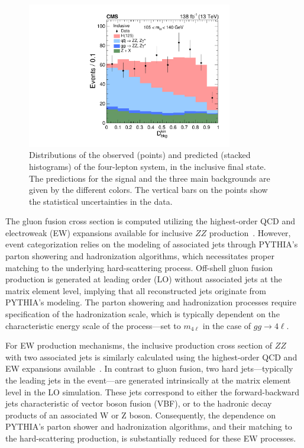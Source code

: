\begin{figure}[!htb]
\centering
\includegraphics[width=0.8\textwidth,clip] {figures/Figure_004.pdf}
\caption{Distributions of the observed (points) and predicted (stacked histograms) \Dbkgkin of the four-lepton system, in the inclusive final state. The predictions for the \Hboson signal and the three main backgrounds are given by the different colors.  The vertical bars on the points show the statistical uncertainties in the data.}
\label{fig:DiscDist}
\end{figure}


The gluon fusion cross section is computed utilizing the highest-order QCD and electroweak (EW) expansions available for inclusive $ZZ$ production~\cite{deFlorian:2016spz}. 
However, event categorization relies on the modeling of associated jets through PYTHIA's parton showering and hadronization algorithms, which necessitates proper matching to the underlying hard-scattering process. Off-shell gluon fusion production is generated at leading order (LO) without associated jets at the matrix element level, implying that all reconstructed jets originate from PYTHIA's modeling. 
The parton showering and hadronization processes require specification of the hadronization scale, which is typically dependent on the characteristic energy scale of the process—set to $m_{4\ell}$ in the case of $gg\to 4\ell$.

For EW production mechanisms, the inclusive production cross section of $ZZ$ with two associated jets is similarly calculated using the highest-order QCD and EW expansions available~\cite{deFlorian:2016spz}. 
In contrast to gluon fusion, two hard jets—typically the leading jets in the event—are generated intrinsically at the matrix element level in the LO simulation. 
These jets correspond to either the forward-backward jets characteristic of vector boson fusion (VBF), or to the hadronic decay products of an associated W or Z boson. 
Consequently, the dependence on PYTHIA's parton shower and hadronization algorithms, and their matching to the hard-scattering production, is substantially reduced for these EW processes.

